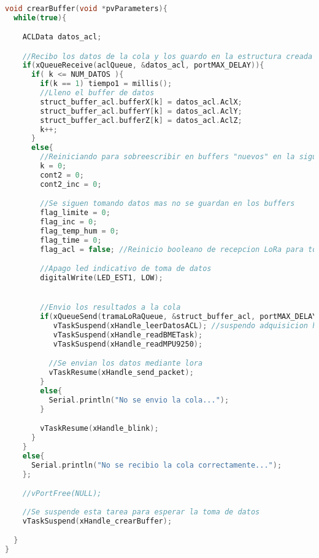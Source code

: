 \begin{lstlisting}[language=C++, caption=Tarea de creación de buffer para envío a módulo LoRa]

void crearBuffer(void *pvParameters){
  while(true){

    ACLData datos_acl;

    //Recibo los datos de la cola y los guardo en la estructura creada
    if(xQueueReceive(aclQueue, &datos_acl, portMAX_DELAY)){
      if( k <= NUM_DATOS ){
        if(k == 1) tiempo1 = millis();
        //Lleno el buffer de datos
        struct_buffer_acl.bufferX[k] = datos_acl.AclX;
        struct_buffer_acl.bufferY[k] = datos_acl.AclY;
        struct_buffer_acl.bufferZ[k] = datos_acl.AclZ;
        k++;
      }
      else{
        //Reiniciando para sobreescribir en buffers "nuevos" en la siguiente accion
        k = 0;
        cont2 = 0;
        cont2_inc = 0;

        //Se siguen tomando datos mas no se guardan en los buffers
        flag_limite = 0;
        flag_inc = 0;
        flag_temp_hum = 0;
        flag_time = 0;
        flag_acl = false; //Reinicio booleano de recepcion LoRa para toma de decisiones en proxima peticion

        //Apago led indicativo de toma de datos
        digitalWrite(LED_EST1, LOW);


        //Envio los resultados a la cola
        if(xQueueSend(tramaLoRaQueue, &struct_buffer_acl, portMAX_DELAY)){
           vTaskSuspend(xHandle_leerDatosACL); //suspendo adquisicion hasta que se envie todo
           vTaskSuspend(xHandle_readBMETask);
           vTaskSuspend(xHandle_readMPU9250);

          //Se envian los datos mediante lora
          vTaskResume(xHandle_send_packet);
        }
        else{
          Serial.println("No se envio la cola...");
        }

        vTaskResume(xHandle_blink);
      }
    }
    else{
      Serial.println("No se recibio la cola correctamente...");
    };

    //vPortFree(NULL);
 
    //Se suspende esta tarea para esperar la toma de datos
    vTaskSuspend(xHandle_crearBuffer);

  }
}

\end{lstlisting}

